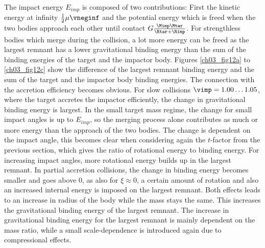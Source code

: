 The impact energy $E_{imp}$ is composed of two contributions: First the kinetic energy at infinity $\frac{1}{2} \mu \vneginf$ and the potential energy which is freed when the two bodies approach each other until contact $G\frac{\Mimp \Mtar}{\Rtar + \Rimp}$. For strengthless bodies which merge during the collision, a lot more energy can be freed as the largest remnant has a lower gravitational binding energy than the sum of the binding energies of the target and the impactor body. Figures \ref{ch03_fig12a} to \ref{ch03_fig12c} show the difference of the largest remnant binding energy and the sum of the target and the impactor body binding energies. The connection with the accretion efficiency becomes obvious. For slow collisions $\vimp = 1.00 \dots 1.05$, where the target accretes the impactor efficiently, the change in gravitational binding energy is largest. In the small target mass regime, the change for small impact angles is up to $E_{imp}$, so the merging process alone contributes as much or more energy than the approach of the two bodies. The change is dependent on the impact angle, this becomes clear when considering again the $t$-factor from the previous section, which gives the ratio of rotational energy to binding energy. For increasing impact angles, more rotational energy builds up in the largest remnant. In partial accretion collisions, the change in binding energy becomes smaller and goes above 0, as also for $\xi \approx 0$, a certain amount of rotation and also an increased internal energy is imposed on the largest remnant. Both effects leads to an increase in radius of the body while the mass stays the same. This increases the gravitational binding energy of the largest remnant. The increase in gravitational binding energy for the largest remnant is mainly dependent on the mass ratio, while a small scale-dependence is introduced again due to compressional effects.

